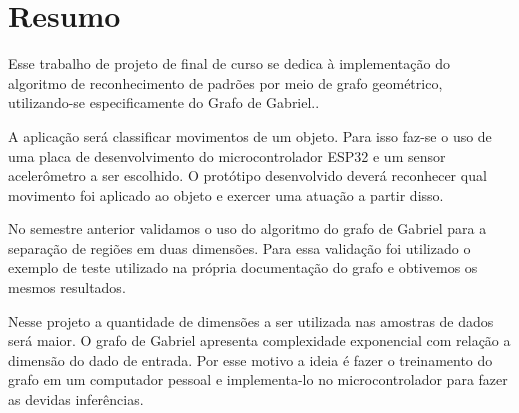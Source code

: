 \section{Resumo}

Esse trabalho de projeto de final de curso se dedica à implementação do algoritmo de reconhecimento de padrões por
meio de grafo geométrico, utilizando-se especificamente do Grafo de Gabriel.\cite*[]{LuizBambirra}.

A aplicação será classificar movimentos de um objeto. Para isso faz-se o uso de uma placa de desenvolvimento do  microcontrolador ESP32 e um sensor 
acelerômetro a ser escolhido. O protótipo desenvolvido deverá reconhecer qual movimento foi aplicado ao objeto e exercer uma atuação a partir disso.

No semestre anterior validamos o uso do algoritmo do grafo de Gabriel para a separação de regiões em duas dimensões. Para essa validação foi utilizado o 
exemplo de teste utilizado na própria documentação do grafo e obtivemos os mesmos resultados. 

Nesse projeto a quantidade de dimensões a ser utilizada nas amostras de dados será maior. O grafo de Gabriel
apresenta complexidade exponencial com relação a dimensão do dado de entrada. Por esse motivo a ideia é fazer o treinamento do grafo
em um computador pessoal e implementa-lo no microcontrolador para fazer as devidas inferências.

